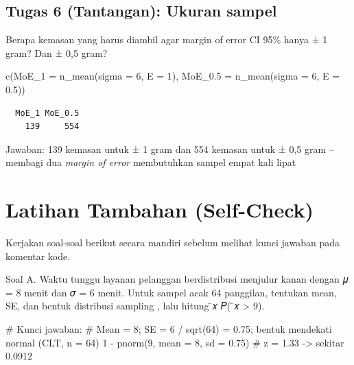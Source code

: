 \documentclass[
  indonesian,
  letterpaper,
]{book}
\newenvironment{Shaded}{\begin{snugshade}}{\end{snugshade}}
\newcommand{\AttributeTok}[1]{\textcolor[rgb]{0.40,0.45,0.13}{#1}}
\newcommand{\CommentTok}[1]{\textcolor[rgb]{0.37,0.37,0.37}{#1}}
\newcommand{\DecValTok}[1]{\textcolor[rgb]{0.68,0.00,0.00}{#1}}
\newcommand{\FloatTok}[1]{\textcolor[rgb]{0.68,0.00,0.00}{#1}}
\newcommand{\FunctionTok}[1]{\textcolor[rgb]{0.28,0.35,0.67}{#1}}
\newcommand{\NormalTok}[1]{\textcolor[rgb]{0.00,0.23,0.31}{#1}}
\newcommand{\SpecialCharTok}[1]{\textcolor[rgb]{0.37,0.37,0.37}{#1}}
\begin{document}
\subsection{Tugas 6 (Tantangan): Ukuran
sampel}\label{tugas-6-tantangan-ukuran-sampel}

Berapa kemasan yang harus diambil agar margin of error CI 95\% hanya ± 1
gram? Dan ± 0,5 gram?

\begin{Shaded}
\begin{Highlighting}[]
\FunctionTok{c}\NormalTok{(}\AttributeTok{MoE\_1 =} \FunctionTok{n\_mean}\NormalTok{(}\AttributeTok{sigma =} \DecValTok{6}\NormalTok{, }\AttributeTok{E =} \DecValTok{1}\NormalTok{), }\AttributeTok{MoE\_0.5 =} \FunctionTok{n\_mean}\NormalTok{(}\AttributeTok{sigma =} \DecValTok{6}\NormalTok{, }\AttributeTok{E =} \FloatTok{0.5}\NormalTok{))}
\end{Highlighting}
\end{Shaded}

\begin{verbatim}
  MoE_1 MoE_0.5 
    139     554 
\end{verbatim}

Jawaban: 139 kemasan untuk ± 1 gram dan 554 kemasan untuk ± 0,5 gram --
membagi dua \emph{margin of error} membutuhkan sampel empat kali lipat

\section{Latihan Tambahan
(Self-Check)}\label{latihan-tambahan-self-check}

Kerjakan soal-soal berikut secara mandiri sebelum melihat kunci jawaban
pada komentar kode.

Soal A. Waktu tunggu layanan pelanggan berdistribusi menjulur kanan
dengan 𝜇 = 8 menit dan 𝜎 = 6 menit. Untuk sampel acak 64 panggilan,
tentukan mean, SE, dan bentuk distribusi sampling , lalu hitung ̄𝑥 𝑃( ̄𝑥
\textgreater{} 9).

\begin{Shaded}
\begin{Highlighting}[]
\CommentTok{\# Kunci jawaban:}
\CommentTok{\# Mean = 8; SE = 6 / sqrt(64) = 0.75; bentuk mendekati normal (CLT, n = 64)}
\DecValTok{1} \SpecialCharTok{{-}} \FunctionTok{pnorm}\NormalTok{(}\DecValTok{9}\NormalTok{, }\AttributeTok{mean =} \DecValTok{8}\NormalTok{, }\AttributeTok{sd =} \FloatTok{0.75}\NormalTok{) }\CommentTok{\# z = 1.33 {-}\textgreater{} sekitar 0.0912}
\end{Highlighting}
\end{Shaded}
\end{document}
